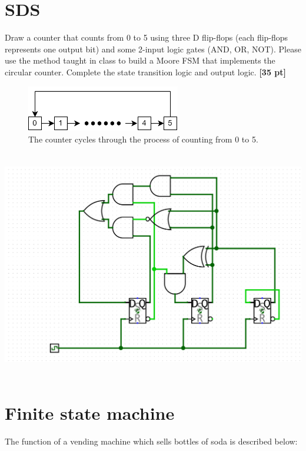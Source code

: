 \documentclass[a4paper]{article}
\begin{document}
\section{SDS}
Draw a counter that counts from 0 to 5 using three D flip-flops (each flip-flops represents one output bit) and some 2-input logic gates (AND, OR, NOT). Please use the method taught in class to build a Moore FSM that implements the circular counter. Complete the state transition logic and output logic. \textbf{[35 pt]}
\begin{figure}[hp]
    \centering
    \includegraphics[height=2cm]{q2.png}
    \caption{The counter cycles through the process of counting from 0 to 5.}
    \label{fig:q2}
\end{figure}
\begin{answer}[Question 2]
    \includegraphics[height=10cm]{Screenshot from 2024-04-23 14-42-25.png}
\end{answer}

\newpage
\section{Finite state machine}

The function of a vending machine which sells bottles of soda is described below:
\end{document}
